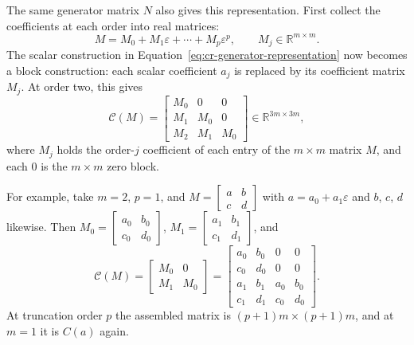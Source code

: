\documentclass[10pt]{article}
\begin{document}
The same generator matrix $N$ also gives this representation.
First collect the coefficients at each order into real matrices:
\[
 M=M_0+M_1\varepsilon+\cdots+M_p\varepsilon^p,
 \qquad M_j\in\mathbb R^{m\times m}.
\]
The scalar construction in Equation~\eqref{eq:cr-generator-representation}
now becomes a block construction: each scalar coefficient $a_j$ is replaced
by its coefficient matrix $M_j$. At order two, this gives
\begin{equation}
\label{eq:matrix-cr}
 \mathcal C(M)=\begin{bmatrix}M_0&0&0\\M_1&M_0&0\\M_2&M_1&M_0\end{bmatrix}
 \in\mathbb R^{3m\times3m},
\end{equation}
where $M_j$ holds the order-$j$ coefficient of each entry of the $m\times m$
matrix $M$, and each $0$ is the $m\times m$ zero block.

For example, take $m=2$, $p=1$, and
$M=\left[\begin{smallmatrix}a&b\\c&d\end{smallmatrix}\right]$ with
$a=a_0+a_1\varepsilon$ and $b$, $c$, $d$ likewise. Then
$M_0=\left[\begin{smallmatrix}a_0&b_0\\c_0&d_0\end{smallmatrix}\right]$,
$M_1=\left[\begin{smallmatrix}a_1&b_1\\c_1&d_1\end{smallmatrix}\right]$, and
\[
 \mathcal C(M)=\begin{bmatrix}M_0&0\\M_1&M_0\end{bmatrix}
 =\left[\begin{array}{cc|cc}
   a_0&b_0&0&0\\
   c_0&d_0&0&0\\\hline
   a_1&b_1&a_0&b_0\\
   c_1&d_1&c_0&d_0
  \end{array}\right].
\] At truncation order $p$ the
assembled matrix is $(p+1)m\times(p+1)m$, and at $m=1$ it is $C(a)$ again.
\end{document}
